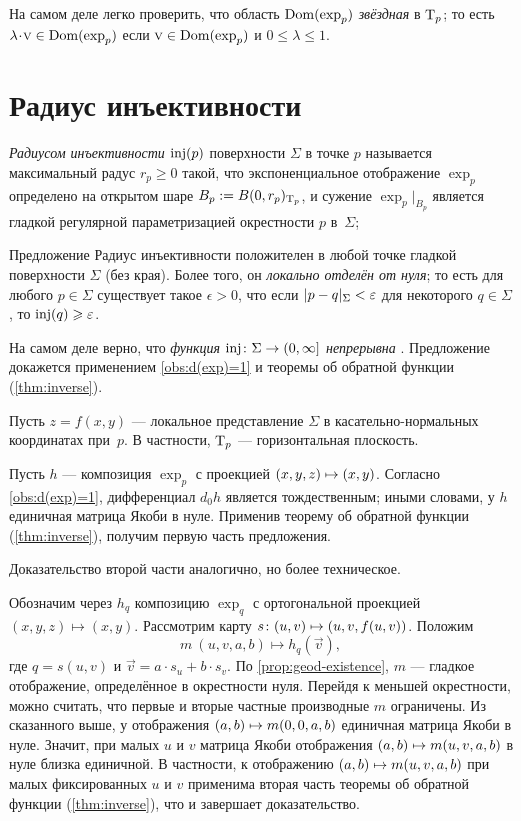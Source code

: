 На самом деле легко проверить, что область $\mathop{\rm Dom}\nolimits(\exp_p)$ \emph{звёздная} в $\mathrm{T}_p$;
то есть $\lambda\cdot\vec v\in \Dom(\exp_p)$ если $\text{\sc{v}}\in \mathop{\rm Dom}\nolimits(\exp_p)$ и $0\le \lambda\le 1$.

\pagebreak[4]%

\section{Радиус инъективности}


\emph{Радиусом инъективности} $\mathop{\rm inj}\nolimits(p)$ поверхности $\Sigma$ в точке $p$ называется максимальный радус $r_p\ge 0$ такой, что экспоненциальное отображение $\exp_p$ определено на открытом шаре $B_p\z\df B(0,r_p)_{\T_p}$,
и сужение $\exp_p|_{B_p}$ является гладкой регулярной параметризацией окрестности $p$ в~$\Sigma$;


\begin{thm}{Предложение}\label{prop:exp}
Радиус инъективности положителен в любой точке гладкой поверхности $\Sigma$ (без края).
Более того, он {}\emph{локально отделён от нуля};
то есть для любого $p\in \Sigma$ существует такое $\epsilon>0$, что если $\dist{p}{q}\Sigma<\epsilon$ для некоторого $q\in \Sigma$, то $\mathop{\rm inj}\nolimits(q)\geqslant\varepsilon$.
\end{thm}

На самом деле верно, что \textit{функция $\inj\:\Sigma\z\to (0,\infty]$ непрерывна} \cite[5.4]{gromoll-klingenberg-meyer}.
Предложение докажется применением \ref{obs:d(exp)=1} и теоремы об обратной функции (\ref{thm:inverse}).

Пусть $z=f(x,y)$ --- локальное представление $\Sigma$ в касательно-нормальных координатах при~$p$.
В частности, $\mathrm{T}_p$ --- горизонтальная плоскость.

Пусть $h$ --- композиция $\exp_p$ с проекцией $(x,y,z)\z\mapsto (x,y)$.
Согласно \ref{obs:d(exp)=1}, дифференциал $d_0h$ является тождественным;
иными словами, у $h$ единичная матрица Якоби в нуле.
Применив теорему об обратной функции (\ref{thm:inverse}), получим первую часть предложения.

Доказательство второй части аналогично, но более техническое.

Обозначим через $h_q$ композицию $\exp_q$ с ортогональной проекцией $(x,y,z)\mapsto (x,y)$.
Рассмотрим карту $s\:(u,v)\z\mapsto (u,v,f(u,v))$.
Положим 
\[m\:(u,v,a,b)\mapsto h_q(\vec v),\]
где $q=s(u,v)$ и $\vec v=a\cdot s_u+b\cdot s_v$.
По \ref{prop:geod-existence}, $m$ --- гладкое отображение, определённое в окрестности нуля.
Перейдя к меньшей окрестности, можно считать, что первые и вторые частные производные $m$ ограничены.
Из сказанного выше, у отображения $(a,b)\z\mapsto m(0,0,a,b)$ единичная матрица Якоби в нуле.
Значит, при малых $u$ и $v$ матрица Якоби отображения $(a,b)\z\mapsto m(u,v,a,b)$ в нуле близка единичной.
В частности, к отображению $(a,b)\z\mapsto m(u,v,a,b)$ при малых фиксированных $u$ и $v$
применима вторая часть теоремы об обратной функции (\ref{thm:inverse}), что и завершает доказательство.
\qeds


